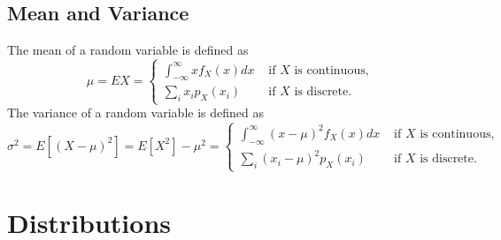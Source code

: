 \documentclass[15pt,a4paper]{book}
\theoremstyle{definition}
\begin{document}
\subsection{Mean and Variance}
The mean of a random variable is defined as
\begin{equation}
    \mu = EX = \begin{cases}
        \int_{-\infty}^{\infty} x f_{X}(x) dx &\text{ if $X$ is continuous,}\\
        \sum_{i} x_{i} p_{X}(x_{i}) &\text{ if $X$ is discrete.}
    \end{cases}
\end{equation}
The variance of a random variable is defined as
\begin{equation}
    \sigma^{2} = E[(X-\mu)^{2}] = E[X^{2}] - \mu^{2} = \begin{cases}
        \int_{-\infty}^{\infty} (x-\mu)^{2} f_{X}(x) dx &\text{ if $X$ is continuous,}\\
        \sum_{i} (x_{i}-\mu)^{2} p_{X}(x_{i}) &\text{ if $X$ is discrete.}
    \end{cases}
\end{equation}

\section{Distributions}
\end{document}
